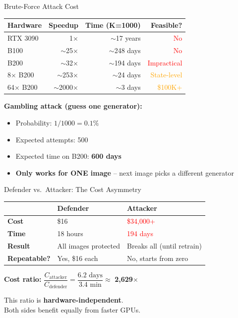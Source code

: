\documentclass[aspectratio=169,11pt]{beamer}
\begin{document}
\begin{frame}{Brute-Force Attack Cost}
\begin{table}
\centering
\begin{tabular}{lrrr}
\toprule
\textbf{Hardware} & \textbf{Speedup} & \textbf{Time (K=1000)} & \textbf{Feasible?} \\
\midrule
RTX 3090 & 1$\times$ & $\sim$17 years & \textcolor{red}{No} \\
B100 & $\sim$25$\times$ & $\sim$248 days & \textcolor{red}{No} \\
B200 & $\sim$32$\times$ & $\sim$194 days & \textcolor{red}{Impractical} \\
8$\times$ B200 & $\sim$253$\times$ & $\sim$24 days & \textcolor{orange}{State-level} \\
64$\times$ B200 & $\sim$2000$\times$ & $\sim$3 days & \textcolor{orange}{\$100K+} \\
\bottomrule
\end{tabular}
\end{table}

\vspace{0.3cm}
\textbf{Gambling attack (guess one generator):}
\begin{itemize}
    \item Probability: $1/1000 = 0.1\%$
    \item Expected attempts: 500
    \item Expected time on B200: \textbf{600 days}
    \item \textbf{Only works for ONE image} -- next image picks a different generator
\end{itemize}
\end{frame}

\begin{frame}{Defender vs.\ Attacker: The Cost Asymmetry}
\begin{table}
\centering
\large
\begin{tabular}{lll}
\toprule
& \textbf{Defender} & \textbf{Attacker} \\
\midrule
\textbf{Cost} & \textcolor{green!60!black}{\$16} & \textcolor{red}{\$34,000+} \\
\textbf{Time} & \textcolor{green!60!black}{18 hours} & \textcolor{red}{194 days} \\
\textbf{Result} & All images protected & Breaks all (until retrain) \\
\textbf{Repeatable?} & Yes, \$16 each & No, starts from zero \\
\bottomrule
\end{tabular}
\end{table}

\vspace{0.5cm}
\begin{center}
\Large
\textbf{Cost ratio:} $\dfrac{C_{\text{attacker}}}{C_{\text{defender}}} = \dfrac{6.2 \text{ days}}{3.4 \text{ min}} \approx$ \textcolor{accent}{\textbf{2,629$\times$}}

\vspace{0.3cm}
\normalsize
This ratio is \textbf{hardware-independent}.\\Both sides benefit equally from faster GPUs.
\end{center}
\end{frame}
\end{document}
